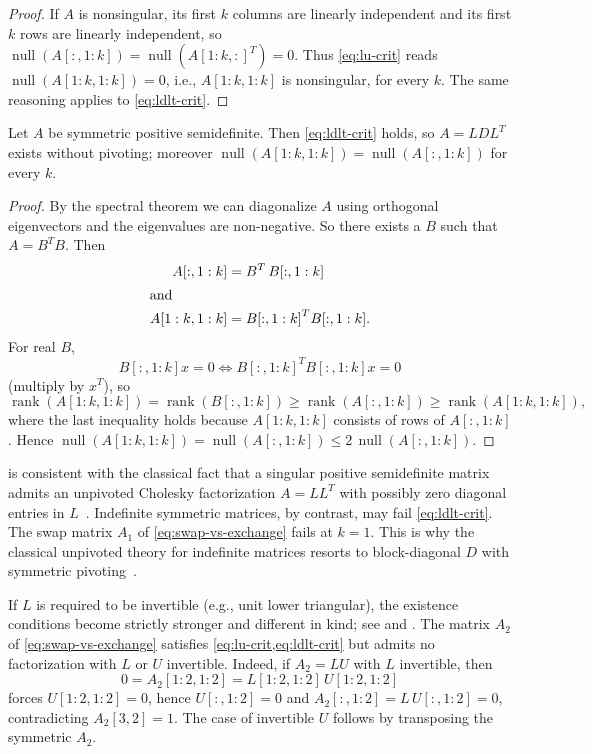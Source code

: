\documentclass[preprint,12pt]{elsarticle}
\theoremstyle{plain}
\theoremstyle{nonumberplain}
\newtheorem{proof}{Proof}
\numberwithin{equation}{section}
\DeclareMathOperator{\rk}{rank}
\DeclareMathOperator{\nl}{null}
\numberwithin{theorem}{section}
\begin{document}
\begin{proof}
  If $A$ is nonsingular, its first $k$ columns are linearly independent and its first $k$ rows are linearly independent, so $\nl(A[:,1:k]) = \nl({A[1:k,:]}^T) = 0$.  Thus \cref{eq:lu-crit} reads $\nl(A[1:k,1:k]) = 0$, i.e., $A[1:k,1:k]$ is nonsingular, for every $k$.  The same reasoning applies to \cref{eq:ldlt-crit}.
\end{proof}

\begin{corollary}\label{cor:psd}
  Let $A$ be symmetric positive semidefinite. Then \cref{eq:ldlt-crit} holds, so $A = LDL^T$ exists without pivoting; moreover $\nl(A[1:k,1:k]) = \nl(A[:,1:k])$ for every $k$.
\end{corollary}

\begin{proof}
  By the spectral theorem we can diagonalize $A$ using orthogonal eigenvectors and the eigenvalues are non-negative. So there exists a $B$ such that $A = B^T B$.  Then
  \begin{align*}
    A[:,1:k] &= B^T \, B[:,1:k] \\
    \intertext{and}
    A[1:k,1:k] &= {B[:,1:k]}^T B[:,1:k].
  \end{align*}
  For real $B$,
  $$B[:,1:k] x = 0 \iff {B[:,1:k]}^T B[:,1:k] x = 0$$ (multiply by $x^T$), so
  $$\rk(A[1:k,1:k]) = \rk(B[:,1:k]) \ge \rk(A[:,1:k]) \ge \rk(A[1:k,1:k]),$$
  where the last inequality holds because $A[1:k,1:k]$ consists of rows of $A[:,1:k]$.  Hence $\nl(A[1:k,1:k]) = \nl(A[:,1:k]) \le 2\,\nl(A[:,1:k])$.
\end{proof}

 is consistent with the classical fact that a singular positive semidefinite matrix admits an unpivoted Cholesky factorization $A = LL^T$ with possibly zero diagonal entries in $L$~\cite{higham_cholesky_1990}.  Indefinite symmetric matrices, by contrast, may fail \cref{eq:ldlt-crit}. The swap matrix $A_1$ of \cref{eq:swap-vs-exchange} fails at $k=1$. This is why the classical unpivoted theory for indefinite matrices resorts to block-diagonal $D$ with symmetric pivoting~\cite{bunch_parlett_1971,bunch_kaufman_1977}.

\begin{remark}\label{rem:zeros}
  If $L$ is required to be invertible (e.g., unit lower triangular), the existence conditions become strictly stronger and different in kind; see \cite{dopico_multiple_2006} and \cite[Sec.~3]{darve_lu_2026}.  The matrix $A_2$ of \cref{eq:swap-vs-exchange} satisfies \cref{eq:lu-crit,eq:ldlt-crit} but admits no factorization with $L$ or $U$ invertible.  Indeed, if $A_2 = LU$ with $L$ invertible, then
  $$0 = A_2[1:2,1:2] = L[1:2,1:2] \, U[1:2,1:2]$$
  forces $U[1:2,1:2] = 0$, hence $U[:,1:2] = 0$ and $A_2[:,1:2] = L \, U[:,1:2] = 0$, contradicting $A_2[3,2] = 1$. The case of invertible $U$ follows by transposing the symmetric $A_2$.
\end{remark}
\end{document}

